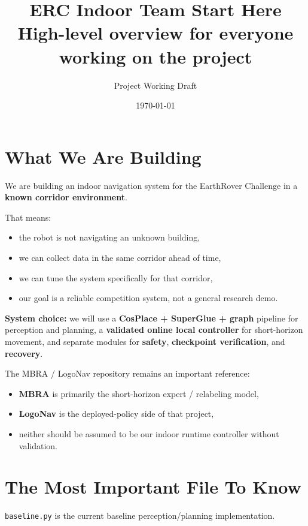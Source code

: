 \documentclass[11pt,a4paper]{article}
\title{ERC Indoor Team Start Here\\[0.3em]
\large High-level overview for everyone working on the project}
\author{Project Working Draft}
\date{\today}
\begin{document}
\maketitle

\section{What We Are Building}

We are building an indoor navigation system for the EarthRover Challenge in a
\textbf{known corridor environment}.

That means:

\begin{itemize}[nosep]
  \item the robot is not navigating an unknown building,
  \item we can collect data in the same corridor ahead of time,
  \item we can tune the system specifically for that corridor,
  \item our goal is a reliable competition system, not a general research demo.
\end{itemize}

\begin{mdframed}
\textbf{System choice:} we will use a \textbf{CosPlace + SuperGlue + graph}
pipeline for perception and planning, a \textbf{validated online local controller}
for short-horizon movement, and separate modules for \textbf{safety},
\textbf{checkpoint verification}, and \textbf{recovery}.

The MBRA / LogoNav repository remains an important reference:

\begin{itemize}[nosep]
  \item \textbf{MBRA} is primarily the short-horizon expert / relabeling model,
  \item \textbf{LogoNav} is the deployed-policy side of that project,
  \item neither should be assumed to be our indoor runtime controller without validation.
\end{itemize}
\end{mdframed}


\section{The Most Important File To Know}

\texttt{baseline.py} is the current baseline perception/planning implementation.
\end{document}

